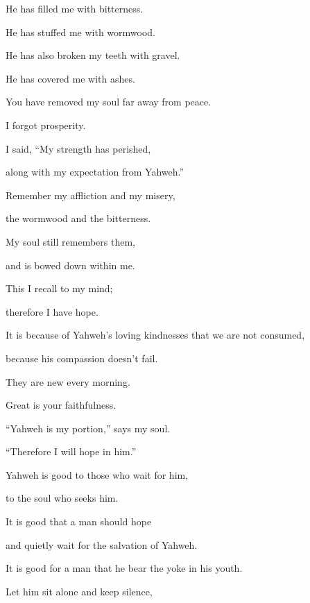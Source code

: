 {\par }{\Q {}He has filled me with bitterness.
\par }{\QB He has stuffed me with wormwood.
\par }{\BB \par }{\Q {}He has also broken my teeth with gravel.
\par }{\QB He has covered me with ashes.
\par }{\Q {}You have removed my soul far away from peace.
\par }{\QB I forgot prosperity.
\par }{\Q {}I said, “My strength has perished,
\par }{\QB along with my expectation from Yahweh.”
\par }{\BB \par }{\Q {}Remember my affliction and my misery,
\par }{\QB the wormwood and the bitterness.
\par }{\Q {}My soul still remembers them,
\par }{\QB and is bowed down within me.
\par }{\Q {}This I recall to my mind;
\par }{\QB therefore I have hope.
\par }{\BB \par }{\Q {}It is because of Yahweh’s loving kindnesses that we are not consumed,
\par }{\QB because his compassion doesn’t fail.
\par }{\Q {}They are new every morning.
\par }{\QB Great is your faithfulness.
\par }{\Q {}“Yahweh is my portion,” says my soul.
\par }{\QB “Therefore I will hope in him.”
\par }{\BB \par }{\Q {}Yahweh is good to those who wait for him,
\par }{\QB to the soul who seeks him.
\par }{\Q {}It is good that a man should hope
\par }{\QB and quietly wait for the salvation of Yahweh.
\par }{\QB {}It is good for a man that he bear the yoke in his youth.
\par }{\BB \par }{\Q {}Let him sit alone and keep silence,
}
